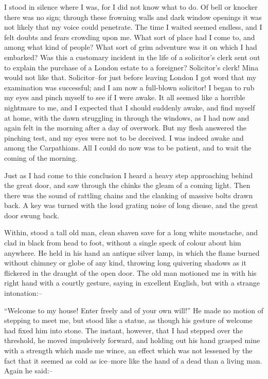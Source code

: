 \documentclass[12pt,openright]{book}
\begin{document}
I stood in silence where I was, for I did not know what to do. Of bell or knocker there was no sign; through these frowning walls and dark window openings it was not likely that my voice could penetrate. The time I waited seemed endless, and I felt doubts and fears crowding upon me. What sort of place had I come to, and among what kind of people? What sort of grim adventure was it on which I had embarked? Was this a customary incident in the life of a solicitor’s clerk sent out to explain the purchase of a London estate to a foreigner? Solicitor’s clerk! Mina would not like that. Solicitor–for just before leaving London I got word that my examination was successful; and I am now a full-blown solicitor! I began to rub my eyes and pinch myself to see if I were awake. It all seemed like a horrible nightmare to me, and I expected that I should suddenly awake, and find myself at home, with the dawn struggling in through the windows, as I had now and again felt in the morning after a day of overwork. But my flesh answered the pinching test, and my eyes were not to be deceived. I was indeed awake and among the Carpathians. All I could do now was to be patient, and to wait the coming of the morning.

Just as I had come to this conclusion I heard a heavy step approaching behind the great door, and saw through the chinks the gleam of a coming light. Then there was the sound of rattling chains and the clanking of massive bolts drawn back. A key was turned with the loud grating noise of long disuse, and the great door swung back.

Within, stood a tall old man, clean shaven save for a long white moustache, and clad in black from head to foot, without a single speck of colour about him anywhere. He held in his hand an antique silver lamp, in which the flame burned without chimney or globe of any kind, throwing long quivering shadows as it flickered in the draught of the open door. The old man motioned me in with his right hand with a courtly gesture, saying in excellent English, but with a strange intonation:–

“Welcome to my house! Enter freely and of your own will!” He made no motion of stepping to meet me, but stood like a statue, as though his gesture of welcome had fixed him into stone. The instant, however, that I had stepped over the threshold, he moved impulsively forward, and holding out his hand grasped mine with a strength which made me wince, an effect which was not lessened by the fact that it seemed as cold as ice–more like the hand of a dead than a living man. Again he said:–
\end{document}
